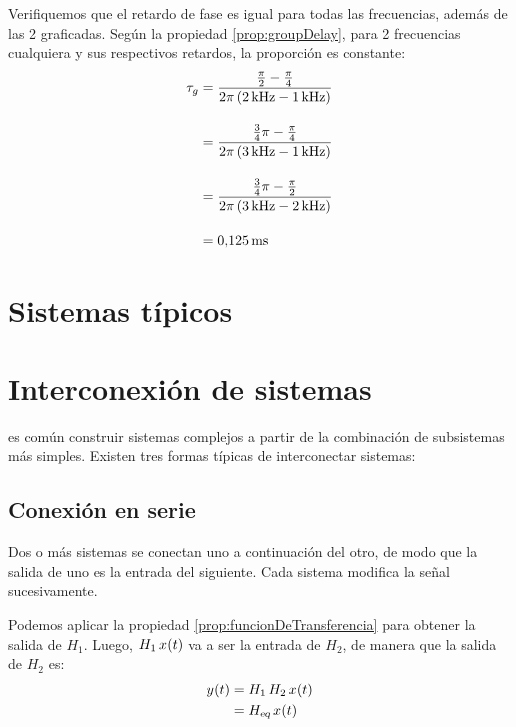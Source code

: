 \begin{mdframed}[style=ExampleFrame]
    Verifiquemos que el retardo de fase es igual para todas las frecuencias, además de las 2 graficadas.
    Según la propiedad \ref{prop:groupDelay}, para 2 frecuencias cualquiera y sus respectivos retardos, la proporción es constante:
    \begin{align*}
        \tau_g
        & = \frac{\frac{\pi}{2} - \frac{\pi}{4}}{2 \pi \inParentheses{\kHz[2] - \kHz[1]}}
        \\[1em]
        & = \frac{\frac{3}{4} \pi - \frac{\pi}{4}}{2 \pi \inParentheses{\kHz[3] - \kHz[1]}}
        \\[1em]
        & = \frac{\frac{3}{4} \pi - \frac{\pi}{2}}{2 \pi \inParentheses{\kHz[3] - \kHz[2]}}
        \\[1em]
        & = \SI{0.125}{\milli\second}
    \end{align*}
\end{mdframed}

\section{Sistemas típicos}

\section{Interconexión de sistemas}

es común construir sistemas complejos a partir de la combinación de subsistemas más simples.
Existen tres formas típicas de interconectar sistemas:

\subsection{Conexión en serie}

Dos o más sistemas se conectan uno a continuación del otro, de modo que la salida de uno es la entrada del siguiente.
Cada sistema modifica la señal sucesivamente.

\begin{center}
    \def\svgwidth{0.8\linewidth}
    
\end{center}

Podemos aplicar la propiedad \ref{prop:funcionDeTransferencia} para obtener la salida de $H_1$.
Luego, $H_1 \, \fx[x]{t}$ va a ser la entrada de $H_2$, de manera que la salida de $H_2$ es:
\begin{align*}
    \fx[y]{t}
    & = H_1 \, H_2 \, \fx[x]{t}
    \\
    & = \sub{H}{eq} \, \fx[x]{t}
\end{align*}

